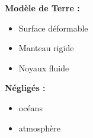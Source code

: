 \begin{frame}

	\begin{minipage}{0.55\textwidth}
	\centering
	\end{minipage}
	\hfil
	\begin{minipage}{0.35\textwidth}
	\textbf{Modèle de Terre :}
	      \begin{itemize}
	        \item Surface déformable
	        \item Manteau rigide
	        \item Noyaux fluide
	      \end{itemize}
	\textbf{Négligés :}
	      \begin{itemize}
	        \item océans
	        \item atmosphère
	      \end{itemize}	    
	\end{minipage}




\end{frame}

